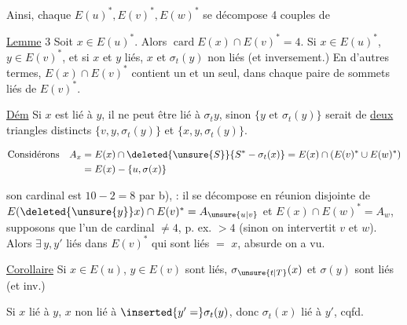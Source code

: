
Ainsi, chaque $E(u)^*,E(v)^*,E(w)^*$ se décompose  4 couples de 

\uline{Lemme} 3 Soit $x\in E(u)^*$. Alors $\operatorname{card} E(x)\cap E(v)^*=4$. Si $x\in E(u)^*$, $y\in E(v)^*$, et si $x$ et $y$ liés, $x$ et $\sigma_t(y)$ non liés (et inversement.) En d'autres termes, $E(x)\cap E(v)^*$ contient un  et un seul, dans chaque paire de sommets liés de $E(v)^*$.

\uline{Dém} Si $x$ est lié à $y$, il ne peut être lié à $\sigma_t y$, sinon $\{y\text{ et }\sigma_t(y)\}$ serait  de \uline{deux} triangles distincts $\{v,y,\sigma_t(y)\}$ et $\{x,y,\sigma_t(y)\}$.   

\[
\begin{aligned}
\text{Considérons}\quad A_x&=E(x)\cap\deleted{\unsure{S}}\{S^*-\sigma_t(x)\}=E(x)\cap(E(v)^*\cup E(w)^*)\\
&=E(x)-\{u,\sigma(x)\}
\end{aligned}
\]

son cardinal est $10-2=8$ par b),  : il se décompose en réunion disjointe de $E(\deleted{\unsure{y}}x)\cap E(v)^*=A_{\unsure{u|v}}$ et $E(x)\cap E(w)^*=A_w$, supposons que l'un   de cardinal $\ne4$, p. ex. $>4$ (sinon on intervertit $v$ et $w$). Alors $\exists\,y,y'$ liés dans $E(v)^*$ qui sont liés  $=$ $x$, absurde on a vu.

\uline{Corollaire} Si $x\in E(u)$, $y\in E(v)$ sont liés, $\sigma_{\unsure{t|T}}(x)$ et $\sigma(y)$ sont liés (et inv.)

Si $x$ lié à $y$, $x$ non lié à $\inserted{y'=}\sigma_t(y)$, donc $\sigma_t(x)$ lié à $y'$, cqfd.

